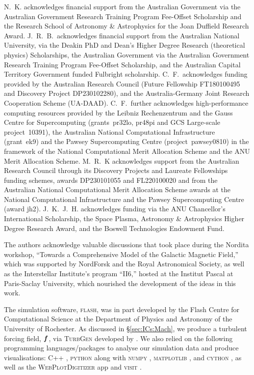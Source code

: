 N.~K. acknowledges financial support from the Australian Government via the Australian Government Research Training Program Fee-Offset Scholarship and the Research School of Astronomy \& Astrophysics for the Joan Duffield Research Award. J.~R.~B.~acknowledges financial support from the Australian National University, via the Deakin PhD and Dean's Higher Degree Research (theoretical physics) Scholarships, the Australian Government via the Australian Government Research Training Program Fee-Offset Scholarship, and the Australian Capital Territory Government funded Fulbright scholarship. C.~F.~acknowledges funding provided by the Australian Research Council (Future Fellowship FT180100495 and Discovery Project DP230102280), and the Australia-Germany Joint Research Cooperation Scheme (UA-DAAD). C.~F.~further acknowledges high-performance computing resources provided by the Leibniz Rechenzentrum and the Gauss Centre for Supercomputing (grants~pr32lo, pr48pi and GCS Large-scale project~10391), the Australian National Computational Infrastructure (grant~ek9) and the Pawsey Supercomputing Centre (project~pawsey0810) in the framework of the National Computational Merit Allocation Scheme and the ANU Merit Allocation Scheme. M.~R.~K acknowledges support from the Australian Research Council through its Discovery Projects and Laureate Fellowships funding schemes, awards DP230101055 and FL220100020 and from the Australian National Computational Merit Allocation Scheme awards at the National Computational Infrastructure and the Pawsey Supercomputing Centre (award jh2). J.~K.~J.~H. acknowledges funding via the ANU Chancellor’s International Scholarship, the Space Plasma, Astronomy \& Astrophysics Higher Degree Research Award, and the Boswell Technologies Endowment Fund.

The authors acknowledge valuable discussions that took place during the Nordita workshop, ``Towards a Comprehensive Model of the Galactic Magnetic Field,'' which was supported by NordForsk and the Royal Astronomical Society, as well as the Interstellar Institute's program ``II6,'' hosted at the Institut Pascal at Paris-Saclay University, which nourished the development of the ideas in this work.

The simulation software, \textsc{flash}, was in part developed by the Flash Centre for Computational Science at the Department of Physics and Astronomy of the University of Rochester. As discussed in \S\ref{sec:ICs:Mach}, we produce a turbulent forcing field, $\bm{f}$, via \textsc{TurbGen} developed by \citet{federrath2010comparing}. We also relied on the following programming languages/packages to analyse our simulation data and produce visualisations: \textsc{C++} \citep{stroustrup2013cpp}, \textsc{python} along with \textsc{numpy} \citep{oliphant2006guide, van2011numpy, harris2020array}, \textsc{matplotlib} \citep{hunter2007matplotlib, bisong2019matplotlib}, and \textsc{cython} \citep{behnel2010cython, smith2015cython}, as well as the \textsc{WebPlotDigitizer} app \citep{Rohatgi2022} and \textsc{visit} \citep{childs2012visit}.

